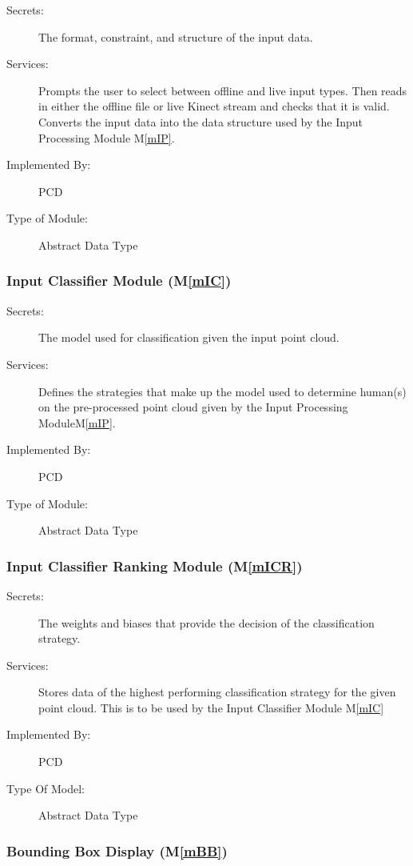 \documentclass[12pt, titlepage]{article}
\newcommand{\mref}[1]{M\ref{#1}}
\begin{document}
\begin{description}
\item[Secrets:]The format, constraint, and structure of the input data.
\item[Services:]Prompts the user to select between offline and live input types. Then reads 
  in either the offline file or live Kinect stream and checks that it is valid.
  Converts the input data into the data structure used by the Input Processing Module \mref{mIP}.
\item[Implemented By:]PCD
\item[Type of Module:]Abstract Data Type
\end{description}

\subsubsection{Input Classifier Module (\mref{mIC})}

\begin{description}
\item[Secrets:]The model used for classification given the input point cloud.
\item[Services:]Defines the strategies that make up the model used to determine human(s) on the pre-processed point 
  cloud given by the Input Processing Module\mref{mIP}.
\item[Implemented By:]PCD
\item[Type of Module:]Abstract Data Type
\end{description}

\subsubsection{Input Classifier Ranking Module (\mref{mICR})}

\begin{description}
\item[Secrets:]The weights and biases that provide the decision of the classification strategy.
\item[Services:]Stores data of the highest performing classification strategy for the given point cloud.
  This is to be used by the Input Classifier Module \mref{mIC}
\item[Implemented By:]PCD
\item[Type Of Model:]Abstract Data Type
\end{description}

\subsubsection{Bounding Box Display (\mref{mBB})}
\end{document}
